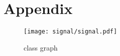 \section{Appendix}

\begin{figure}[h]
 \centering
 \texttt{[image: signal/signal.pdf]}
 \caption{class graph}
 \label{fig: signal abstract}
\end{figure}







